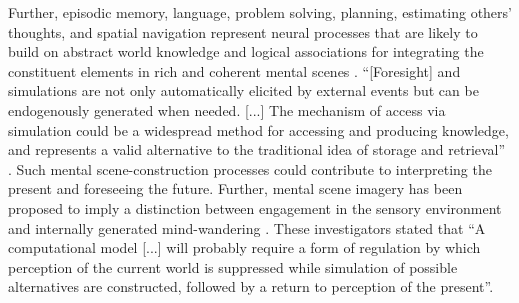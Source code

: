 \documentclass[10pt,letterpaper]{article}
\begin{document}
Further,
episodic memory, language, problem solving,
planning, estimating others' thoughts, and spatial navigation
represent neural processes that are likely to
build on abstract world knowledge and logical associations
for integrating the constituent elements in rich and coherent mental scenes
\citep{schacter2007remembering}.
``[Foresight] and simulations are not only automatically elicited by external events but can be endogenously generated when needed. [...] The mechanism of access via simulation could be a widespread method for accessing and producing knowledge, and represents a valid alternative to the traditional idea of storage and retrieval''
\citep{pezzulo2011grounding}.
Such mental scene-construction processes could contribute to interpreting the
present and foreseeing the future.
Further, mental scene imagery has been proposed
to imply a distinction between
engagement in the sensory environment
and internally generated mind-wandering
\citep{buckner2007self}.
These investigators stated that
``A computational model [...] will probably require a form of
regulation by which perception of the current world is suppressed
while simulation of possible alternatives are constructed,
followed by a return to perception of the present''.
\end{document}
